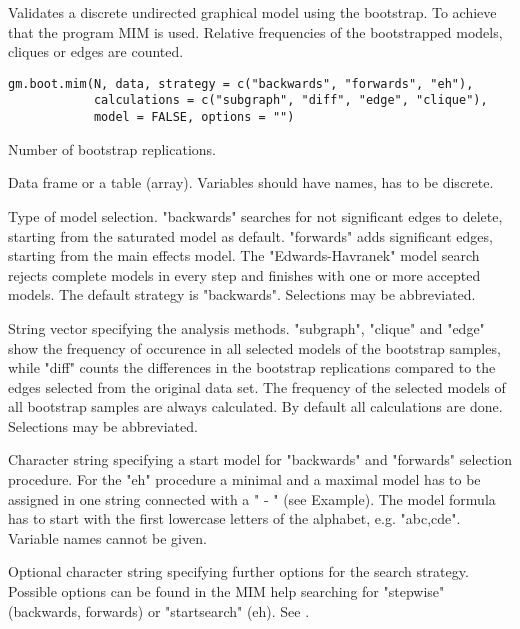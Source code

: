 \begin{Description}\relax
Validates a discrete undirected graphical model using the bootstrap.
To achieve that the program MIM is used.
Relative frequencies of the bootstrapped models, cliques or edges are counted.
\end{Description}
\begin{Usage}
\begin{verbatim}
gm.boot.mim(N, data, strategy = c("backwards", "forwards", "eh"),
            calculations = c("subgraph", "diff", "edge", "clique"),
            model = FALSE, options = "")
\end{verbatim}
\end{Usage}
\begin{Arguments}
\begin{ldescription}
\item[\code{N}] Number of bootstrap replications. 
\item[\code{data}] Data frame or a table (array). Variables should have names,  has to be discrete. 
\item[\code{strategy}] Type of model selection. "backwards" searches for not significant edges to delete, starting from the saturated model as default.
"forwards" adds significant edges, starting from the main effects model. The "Edwards-Havranek"
model search rejects complete models in every step and finishes with one or more accepted models.
The default strategy is "backwards". Selections may be abbreviated.

\item[\code{calculations}] String vector specifying the analysis methods. "subgraph", "clique" and "edge" show the frequency of occurence 
in all selected models of the bootstrap samples, while "diff" counts the differences
in the bootstrap replications compared to the edges selected from the original data set.
The frequency of the selected models of all bootstrap samples are always calculated. By default all calculations are done.
Selections may be abbreviated.

\item[\code{model}] Character string specifying a start model for "backwards" and "forwards" selection procedure.
For the "eh" procedure a minimal and a maximal model has to be assigned in one string
connected with a " - " (see Example). The model formula has to start with the first lowercase letters of the alphabet, e.g. "abc,cde". Variable names cannot be given.

\item[\code{options}] Optional character string specifying further options for the search strategy. Possible options can be found in the MIM help searching for
"stepwise" (backwards, forwards) or "startsearch" (eh).  See .

\end{ldescription}
\end{Arguments}
